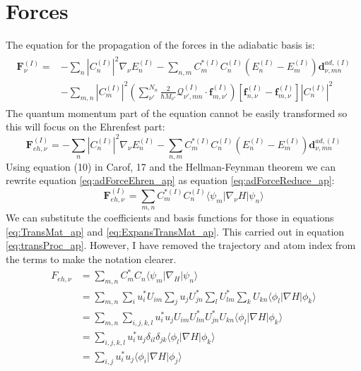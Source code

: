 \label{chap:basisTrans}
\section{Forces}
\label{sect:ad2di_frc}
The equation for the propagation of the forces in the adiabatic basis is:
\begin{align}
  \begin{split}
      \mathbf{F}_{\nu}^{(I)} = &- \sum_{n} |C_{n}^{(I)}|^2                    \nabla_{\nu}E_{n}^{(I)} - \sum_{n, m} C_{m}^{* (I)} C_{n}^{(I)}               \left(E_{n}^{(I)} - E_{m}^{(I)} \right) \mathbf{d}_{\nu, mn}^{ad, (I)} \\
      &- \sum_{m, n} |C_{m}^{(I)}|^2 \left( \sum_{\nu'}^{N_{n}} \frac{2}{\hbar   M_{\nu'}} \mathcal{Q}_{\nu', mn}^{(I)} \cdot \mathbf{f}_{m, \nu'}^{(I)}       \right)\left[ \mathbf{f}_{n, \nu}^{(I)} -            \mathbf{f}_{m, \nu}^{(I)} \right] |C_{n}^{(I)}|^2 
  \end{split}
  \label{eq:adForce_ap}
\end{align}
The quantum momentum part of the equation cannot be easily transformed so this will focus on the Ehrenfest part:
\begin{equation}
  \mathbf{F}_{eh, \nu}^{(I)} = - \sum_{n} |C_{n}^{(I)}|^2 \nabla_{\nu}E_{n}^{(I)} - \sum_{n, m} C_{m}^{* (I)} C_{n}^{(I)} \left(E_{n}^{(I)} - E_{m}^{(I)} \right) \mathbf{d}_{\nu, mn}^{ad, (I)}
  \label{eq:adForceEhren_ap}
\end{equation}
Using equation (10) in Carof, 17 \cite{carof_detailed_2017} and the Hellman-Feynman theorem we can rewrite equation \eqref{eq:adForceEhren_ap} as equation \eqref{eq:adForceReduce_ap}:
\begin{equation}
  \mathbf{F}_{eh, \nu}^{(I)} = \sum_{m, n} C_{m}^{* (I)} C_{n}^{(I)} \langle \psi_{m} | \nabla_{\nu} H | \psi_{n} \rangle
  \label{eq:adForceReduce_ap}
\end{equation}
We can substitute the coefficients and basis functions for those in equations \eqref{eq:TransMat_ap} and \eqref{eq:ExpansTransMat_ap}. This carried out in equation \eqref{eq:transProc_ap}. However, I have removed the trajectory and atom index from the terms to make the notation clearer.
\begin{align}
  F_{eh, \nu} &= \sum_{m, n} C^{*}_{m} C_{n} \langle \psi_{m} | \nabla_ H | \psi_{n} \rangle \\
  &= \sum_{m, n} \sum_{i} u_i^{*} U_{im} \sum_{j} u_j U^{*}_{jn} \sum_{l}U_{lm}^{*} \sum_{k} U_{kn} \langle \phi_{l} | \nabla H | \phi_{k} \rangle \\ 
  &= \sum_{m, n} \sum_{i, j, k, l} u_i^{*}  u_j U_{im} U_{lm}^{*} U^{*}_{jn} U_{kn} \langle \phi_{l} | \nabla H | \phi_{k} \rangle \\ 
  &= \sum_{i, j, k, l} u_i^{*}  u_j \delta_{il} \delta_{jk} \langle \phi_{l} | \nabla H | \phi_{k} \rangle \\ 
  &= \sum_{i, j} u_i^{*}  u_j \langle \phi_{i} | \nabla H | \phi_{j} \rangle 
  \label{eq:transProc_ap}
\end{align}
